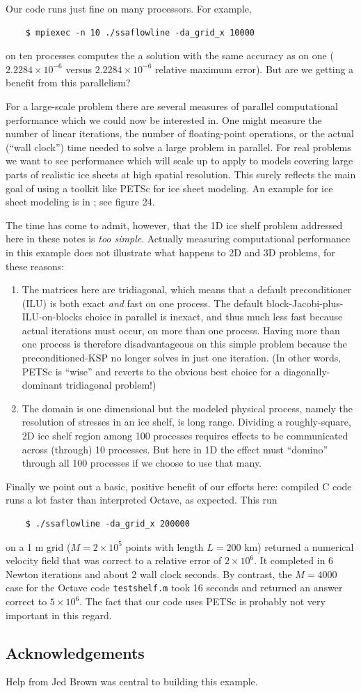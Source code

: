 \documentclass[11pt,final,reqno]{amsart}
\begin{document}
Our code runs just fine on many processors.  For example,
\begin{Verbatim}
    $ mpiexec -n 10 ./ssaflowline -da_grid_x 10000
\end{Verbatim}
on ten processes computes the a solution with the same accuracy as on one ($2.2284\times 10^{-6}$ versus $2.2284\times 10^{-6}$ relative maximum error).  But are we getting a benefit from this parallelism?

For a large-scale problem there are several measures of parallel computational performance which we could now be interested in.  One might measure the number of linear iterations, the number of floating-point operations, or the actual (``wall clock'') time needed to solve a large problem in parallel.  For real problems we want to see performance which will scale up to apply to models covering large parts of realistic ice sheets at high spatial resolution.  This surely reflects the main goal of using a toolkit like PETSc for ice sheet modeling.  An example for ice sheet modeling is in \cite{BBssasliding}; see figure 24.

The time has come to admit, however, that the 1D ice shelf problem addressed here in these notes is \emph{too simple}.  Actually measuring computational performance in this example does not illustrate what happens to 2D and 3D problems, for these reasons:\begin{enumerate}
\item The matrices here are tridiagonal, which means that a default preconditioner (ILU) is both exact \emph{and} fast on one process.  The default block-Jacobi-plus-ILU-on-blocks choice in parallel is inexact, and thus much less fast because actual iterations must occur, on more than one process.  Having more than one process is therefore disadvantageous on this simple problem because the preconditioned-KSP no longer solves in just one iteration.  (In other words, PETSc is ``wise'' and reverts to the obvious best choice for a diagonally-dominant tridiagonal problem!)
\item The domain is one dimensional but the modeled physical process, namely the resolution of stresses in an ice shelf, is long range.  Dividing a roughly-square, 2D ice shelf region among 100 processes requires effects to be communicated across (through) 10 processes.  But here in 1D the effect must ``domino'' through all 100 processes if we choose to use that many.
\end{enumerate}

Finally we point out a basic, positive benefit of our efforts here: compiled C code runs a lot faster than interpreted Octave, as expected.  This run
\begin{Verbatim}
    $ ./ssaflowline -da_grid_x 200000
\end{Verbatim}
on a 1 m grid ($M=2\times 10^5$ points with length $L=200$ km) returned a numerical velocity field that was correct to a relative error of $2\times 10^6$.  It completed in 6 Newton iterations and about 2 wall clock seconds.  By contrast, the $M=4000$ case for the Octave code \texttt{testshelf.m} took 16 seconds and returned an answer correct to $5 \times 10^6$.  The fact that our code uses PETSc is probably not very important in this regard.

\subsection*{Acknowledgements}  Help from Jed Brown was central to building this example.



\end{document}
